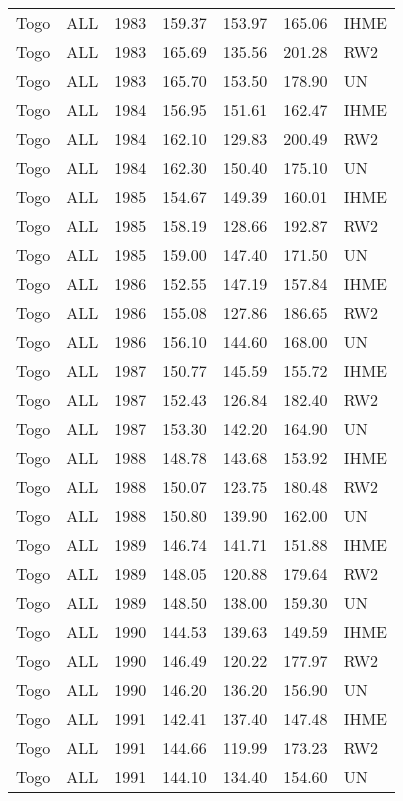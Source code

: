 \begin{longtable}{lllrrrl}
  Togo & ALL & 1983 & 159.37 & 153.97 & 165.06 & IHME \\ 
  Togo & ALL & 1983 & 165.69 & 135.56 & 201.28 & RW2 \\ 
  Togo & ALL & 1983 & 165.70 & 153.50 & 178.90 & UN \\ 
  Togo & ALL & 1984 & 156.95 & 151.61 & 162.47 & IHME \\ 
  Togo & ALL & 1984 & 162.10 & 129.83 & 200.49 & RW2 \\ 
  Togo & ALL & 1984 & 162.30 & 150.40 & 175.10 & UN \\ 
  Togo & ALL & 1985 & 154.67 & 149.39 & 160.01 & IHME \\ 
  Togo & ALL & 1985 & 158.19 & 128.66 & 192.87 & RW2 \\ 
  Togo & ALL & 1985 & 159.00 & 147.40 & 171.50 & UN \\ 
  Togo & ALL & 1986 & 152.55 & 147.19 & 157.84 & IHME \\ 
  Togo & ALL & 1986 & 155.08 & 127.86 & 186.65 & RW2 \\ 
  Togo & ALL & 1986 & 156.10 & 144.60 & 168.00 & UN \\ 
  Togo & ALL & 1987 & 150.77 & 145.59 & 155.72 & IHME \\ 
  Togo & ALL & 1987 & 152.43 & 126.84 & 182.40 & RW2 \\ 
  Togo & ALL & 1987 & 153.30 & 142.20 & 164.90 & UN \\ 
  Togo & ALL & 1988 & 148.78 & 143.68 & 153.92 & IHME \\ 
  Togo & ALL & 1988 & 150.07 & 123.75 & 180.48 & RW2 \\ 
  Togo & ALL & 1988 & 150.80 & 139.90 & 162.00 & UN \\ 
  Togo & ALL & 1989 & 146.74 & 141.71 & 151.88 & IHME \\ 
  Togo & ALL & 1989 & 148.05 & 120.88 & 179.64 & RW2 \\ 
  Togo & ALL & 1989 & 148.50 & 138.00 & 159.30 & UN \\ 
  Togo & ALL & 1990 & 144.53 & 139.63 & 149.59 & IHME \\ 
  Togo & ALL & 1990 & 146.49 & 120.22 & 177.97 & RW2 \\ 
  Togo & ALL & 1990 & 146.20 & 136.20 & 156.90 & UN \\ 
  Togo & ALL & 1991 & 142.41 & 137.40 & 147.48 & IHME \\ 
  Togo & ALL & 1991 & 144.66 & 119.99 & 173.23 & RW2 \\ 
  Togo & ALL & 1991 & 144.10 & 134.40 & 154.60 & UN \\ 

\end{longtable}
